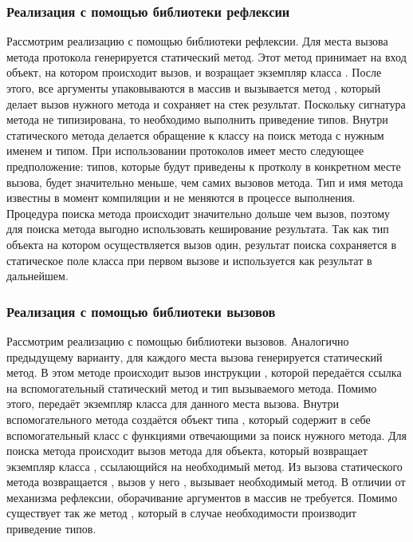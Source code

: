\subsubsection{Реализация с помощью библиотеки рефлексии}
Рассмотрим реализацию с помощью библиотеки рефлексии. Для места вызова метода протокола генерируется статический метод. Этот метод принимает на вход объект, на котором происходит вызов, и возращает экземпляр класса . После этого, все аргументы упаковываются в массив и вызывается метод , который делает вызов нужного метода и сохраняет на стек результат. Поскольку сигнатура метода  не типизирована, то необходимо выполнить приведение типов. Внутри статического метода делается обращение к классу на поиск метода с нужным именем и типом. При использовании протоколов имеет место следующее предположение: типов, которые будут приведены к протколу в конкретном месте вызова, будет значительно меньше, чем самих вызовов метода. Тип и имя метода известны в момент компиляции и не меняются в процессе выполнения. Процедура поиска метода происходит значительно дольше чем вызов, поэтому для поиска метода выгодно использовать кеширование результата. Так как тип объекта на котором осуществляется вызов один, результат поиска сохраняется в статическое поле класса при первом вызове и используется как результат в дальнейшем.

\subsubsection{Реализация с помощью библиотеки вызовов}
Рассмотрим реализацию с помощью библиотеки вызовов. Аналогично предыдущему варианту, для каждого места вызова генерируется статический метод. В этом методе происходит вызов инструкции , которой передаётся ссылка на вспомогательный статический метод и тип вызываемого метода. Помимо этого,  передаёт экземпляр класса  для данного места вызова. Внутри вспомогательного метода создаётся объект типа , который содержит в себе вспомогательный класс с функциями отвечающими за поиск нужного метода. Для поиска метода происходит вызов метода  для объекта, который возвращает экземпляр класса , ссылающийся на необходимый метод. Из вызова статического метода возвращается , вызов у него , вызывает необходимый метод. В отличии от механизма рефлексии, оборачивание аргументов в массив не требуется. Помимо  существует так же метод , который в случае необходимости производит приведение типов.

